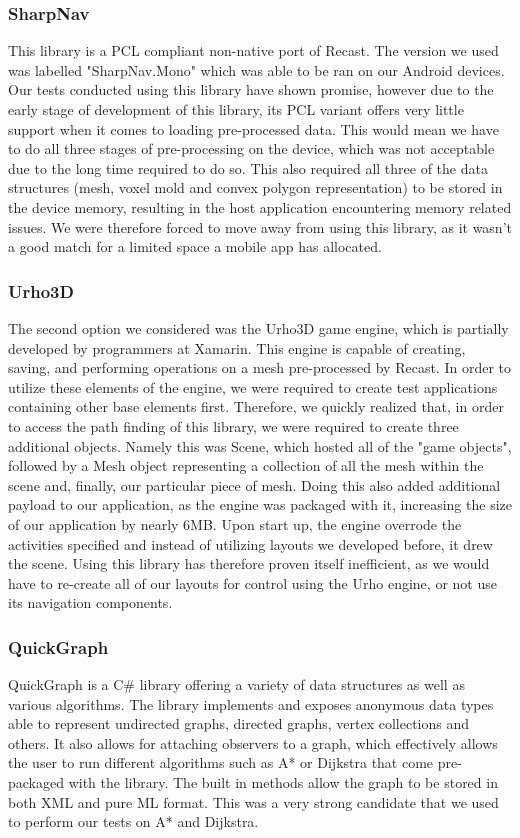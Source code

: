 \documentclass[main.tex]{subfiles}
\begin{document}
\subsubsection{SharpNav}
This library\cite{libSharpnav} is a PCL compliant non-native port of Recast. The version we used was labelled "SharpNav.Mono" which was able to be ran on our Android devices. Our tests conducted using this library have shown promise, however due to the early stage of development of this library, its PCL variant offers very little support when it comes to loading pre-processed data. This would mean we have to do all three stages of pre-processing on the device, which was not acceptable due to the long time required to do so. This also required all three of the data structures (mesh, voxel mold and convex polygon representation) to be stored in the device memory, resulting in the host application encountering memory related issues. We were therefore forced to move away from using this library, as it wasn't a good match for a limited space a mobile app has allocated.

\subsubsection{Urho3D}
The second option we considered was the Urho3D game engine, which is partially developed by programmers at Xamarin. This engine\cite{libUrho} is capable of creating, saving, and performing operations on a mesh pre-processed by Recast. In order to utilize these elements of the engine, we were required to create test applications containing other base elements first. Therefore, we quickly realized that, in order to access the path finding of this library, we were required to create three additional objects. Namely this was Scene, which hosted all of the "game objects", followed by a Mesh object representing a collection of all the mesh within the scene and, finally, our particular piece of mesh. Doing this also added additional payload to our application, as the engine was packaged with it, increasing the size of our application by nearly 6MB. Upon start up, the engine overrode the activities specified and instead of utilizing layouts we developed before, it drew the scene. Using this library has therefore proven itself inefficient, as we would have to re-create all of our layouts for control using the Urho engine, or not use its navigation components.

\subsubsection{QuickGraph}
QuickGraph\cite{libQuickgraph} is a C\# library offering a variety of data structures as well as various algorithms. The library implements and exposes anonymous data types able to represent undirected graphs, directed graphs, vertex collections and others. It also allows for attaching observers to a graph, which effectively allows the user to run different algorithms such as A* or Dijkstra that come pre-packaged with the library. The built in methods allow the graph to be stored in both XML and pure ML format. This was a very strong candidate that we used to perform our tests on A* and Dijkstra.
\end{document}
